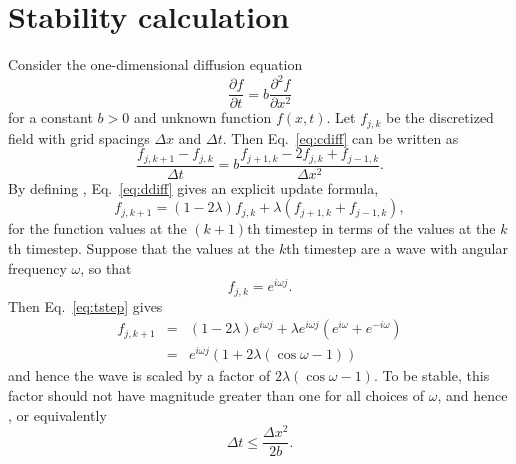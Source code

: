 \documentclass[12pt]{article}
\newcommand{\p}{\partial}
\begin{document}
\section*{Stability calculation}
Consider the one-dimensional diffusion equation
\begin{equation}
  \label{eq:cdiff}
  \frac{\p f}{\p t} = b \frac{\p^2 f}{\p x^2}
\end{equation}
for a constant $b>0$ and unknown function $f(x,t)$. Let $f_{j,k}$ be the discretized field with
grid spacings $\Delta x$ and $\Delta t$. Then Eq.~\ref{eq:cdiff} can be written as
\begin{equation}
  \label{eq:ddiff}
  \frac{f_{j,k+1}-f_{j,k}}{\Delta t} = b \frac{f_{j+1,k} - 2f_{j,k} + f_{j-1,k}}{\Delta x^2}.
\end{equation}
By defining , Eq.~\ref{eq:ddiff} gives an
explicit update formula,
\begin{equation}
  \label{eq:tstep}
  f_{j,k+1} = (1 - 2\lambda)f_{j,k} + \lambda(f_{j+1,k}+f_{j-1,k}),
\end{equation}
for the function values at the $(k+1)$th timestep in terms of the values at the
$k$th timestep. Suppose that the values at the $k$th timestep are a wave with
angular frequency $\omega$, so that
\begin{equation}
  f_{j,k} = e^{i\omega j}.
\end{equation}
Then Eq.~\ref{eq:tstep} gives
\begin{eqnarray}
  f_{j,k+1} &=& (1 - 2\lambda) e^{i \omega j} + \lambda e^{i\omega j} ( e^{i\omega} + e^{-i\omega}) \nonumber \\
  &=& e^{i\omega j} (1 + 2\lambda (\cos \omega - 1) )
\end{eqnarray}
and hence the wave is scaled by a factor of $2\lambda (\cos \omega -1)$. To be
stable, this factor should not have magnitude greater than one for all choices
of $\omega$, and hence , or equivalently
\begin{equation}
  \Delta t \le \frac{\Delta x^2}{2b}.
\end{equation}
\end{document}
